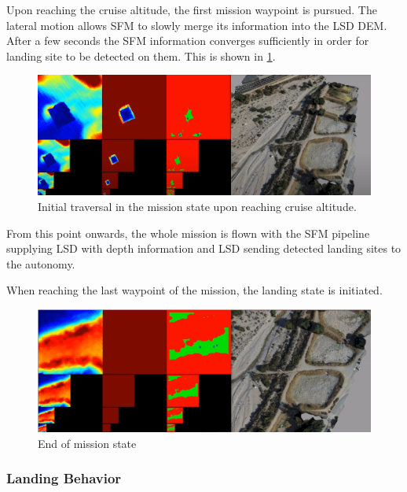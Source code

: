 Upon reaching the cruise altitude, the first mission waypoint is pursued. The lateral motion allows SFM to slowly merge its information into the LSD DEM. After a few seconds the SFM information converges sufficiently in order for landing site to be detected on them. This is shown in \cref{fig:demo_mission1}.

\begin{figure}[h]
\centering
\includegraphics[scale=0.25]{images/autonomous_landing/demo_flight/mission1.png}
\caption{Initial traversal in the mission state upon reaching cruise altitude.}
\label{fig:demo_mission1}
\end{figure}

From this point onwards, the whole mission is flown with the SFM pipeline supplying LSD with depth information and LSD sending detected landing sites to the autonomy.

When reaching the last waypoint of the mission, the landing state is initiated. 

\begin{figure}[h]
\centering
\includegraphics[scale=0.25]{images/autonomous_landing/demo_flight/mission_end.png}
\caption{End of mission state}
\label{fig:demo_mission_end}%
\end{figure}

\clearpage %
\subsubsection{Landing Behavior}

